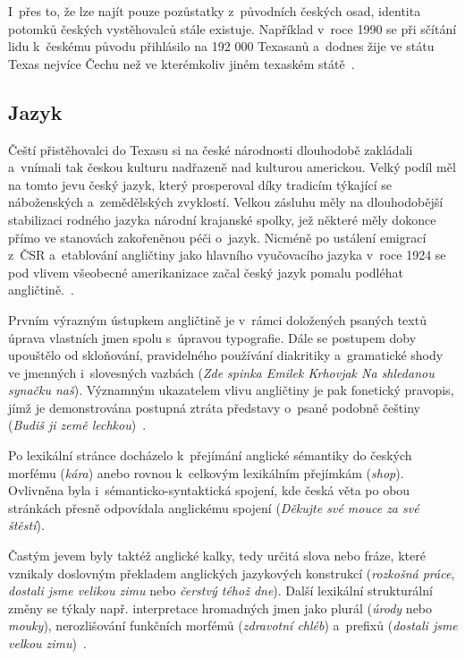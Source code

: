 I~přes to, že lze najít pouze pozůstatky z~původních českých osad, identita potomků českých vystěhovalců stále existuje. Například v~roce 1990 se při sčítání lidu k~českému původu přihlásilo na 192 000 Texasanů a~dodnes žije ve státu Texas nejvíce Čechu než ve kterémkoliv jiném texaském státě~\parencite{Eckertova2004}.

\hypertarget{jazyk-2}{%
\subsection*{Jazyk}\label{jazyk-2}}

Čeští přistěhovalci do Texasu si na české národnosti dlouhodobě zakládali a~vnímali tak českou kulturu nadřazeně nad kulturou americkou. Velký podíl měl na tomto jevu český jazyk, který prosperoval díky tradicím týkající se náboženských a~zemědělských zvyklostí. Velkou zásluhu měly na dlouhodobější stabilizaci rodného jazyka národní krajanské spolky, jež některé měly dokonce přímo ve stanovách zakořeněnou péči o~jazyk. Nicméně po ustálení emigrací z~ČSR a~etablování angličtiny jako hlavního vyučovacího jazyka v~roce 1924 se pod vlivem všeobecné amerikanizace začal český jazyk pomalu podléhat angličtině.~\parencite{amerika2017}.

Prvním výrazným ústupkem angličtině je v~rámci doložených psaných textů úprava vlastních jmen spolu s~úpravou typografie. Dále se postupem doby upouštělo od skloňování, pravidelného používání diakritiky a~gramatické shody ve jmenných i~slovesných vazbách (\emph{Zde spinka Emilek Krhovjak Na shledanou synačku naš}). Významným ukazatelem vlivu angličtiny je pak fonetický pravopis, jímž je demonstrována postupná ztráta představy o~psané podobně češtiny (\emph{Budiš ji země lechkou})~\parencite{Eckertová97}.

Po lexikální stránce docházelo k~přejímání anglické sémantiky do českých morfému (\emph{kára}) anebo rovnou k~celkovým lexikálním přejímkám (\emph{shop}). Ovlivněna byla i~sémanticko-syntaktická spojení, kde česká věta po obou stránkách přesně odpovídala anglickému spojení (\emph{Děkujte své mouce za své štěstí}).

Častým jevem byly taktéž anglické kalky, tedy určitá slova nebo fráze, které vznikaly doslovným překladem anglických jazykových konstrukcí (\emph{rozkošná práce}, \emph{dostali jsme velikou zimu} nebo \emph{čerstvý téhož dne}). Další lexikální strukturální změny se týkaly např. interpretace hromadných jmen jako plurál (\emph{úrody} nebo \emph{mouky}), nerozlišování funkčních morfémů (\emph{zdravotní chléb}) a~prefixů (\emph{dostali jsme velkou zimu})~\parencite{amerika2017}.

